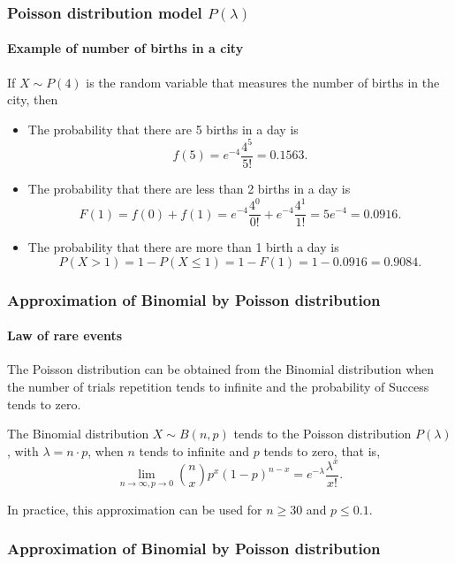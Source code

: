 \begin{frame}
\frametitle{Poisson distribution model $P(\lambda)$}
\framesubtitle{Example of number of births in a city}
If $X\sim P(4)$ is the random variable that measures the number of births in the city, then
\begin{itemize}
\item The probability that there are 5 births in a day is
\[
f(5) = e^{-4}\frac{4^5}{5!} = 0.1563.
\]
\item The probability that there are less than 2 births in a day is
\[
F(1) = f(0)+f(1) = e^{-4}\frac{4^0}{0!} + e^{-4}\frac{4^1}{1!} = 5e^{-4} = 0.0916.
\]
\item The probability that there are more than 1 birth a day is 
\[
P(X>1) = 1-P(X\leq 1) = 1-F(1) = 1-0.0916 = 0.9084.
\]
\end{itemize}
\end{frame}


\begin{frame}
\frametitle{Approximation of Binomial by Poisson distribution}
\framesubtitle{Law of rare events}
The Poisson distribution can be obtained from the Binomial distribution when the number of trials repetition tends to infinite and the probability of Success tends to zero. 

\begin{theorem}
The Binomial distribution $X\sim B(n,p)$ tends to the Poisson distribution $P(\lambda)$, with $\lambda=n\cdot p$, when
$n$ tends to infinite and $p$ tends to zero, that is,
\[
\lim_{n\rightarrow \infty, p\rightarrow 0}\binom{n}{x}p^x(1-p)^{n-x} = e^{-\lambda}\frac{\lambda^x}{x!}.
\]
\end{theorem}

In practice, this approximation can be used for $n\geq 30$ and $p\leq 0.1$.
\end{frame}


\begin{frame}
\frametitle{Approximation of Binomial by Poisson distribution}
\begin{center}
\end{center}
\end{frame}


